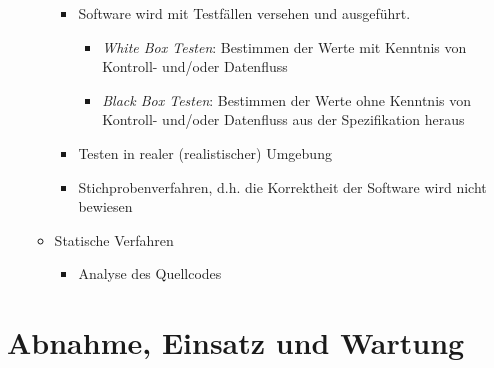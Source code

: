 \documentclass{article}
\begin{document}
\begin{itemize}
\begin{itemize}
\begin{itemize}
      \item Software wird mit Testfällen versehen und ausgeführt.
      \begin{itemize}
        \item \textit{White Box Testen}: Bestimmen der Werte mit Kenntnis von Kontroll- und/oder Datenfluss
        \item \textit{Black Box Testen}: Bestimmen der Werte ohne Kenntnis von Kontroll- und/oder Datenfluss aus der Spezifikation heraus
      \end{itemize}
      \item Testen in realer (realistischer) Umgebung
      \item Stichprobenverfahren, d.h. die Korrektheit der Software wird nicht bewiesen
    \end{itemize}
    \item Statische Verfahren
    \begin{itemize}
      \item Analyse des Quellcodes
    \end{itemize}
  \end{itemize}
\end{itemize}

\section{Abnahme, Einsatz und Wartung}
\end{document}
